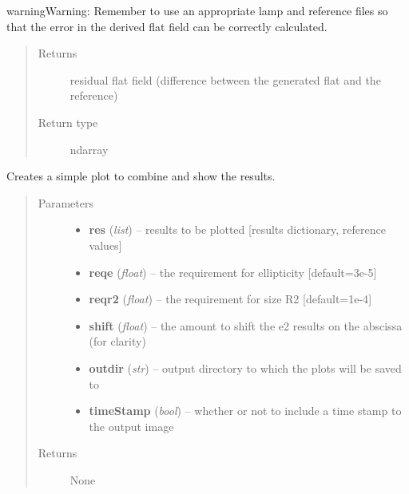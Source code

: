 \documentclass[a4paper,11pt,english]{sphinxmanual}
\begin{document}
\begin{fulllineitems}
\begin{notice}{warning}{Warning:}
Remember to use an appropriate lamp and reference files so that the error in the derived
flat field can be correctly calculated.
\end{notice}
\begin{quote}\begin{description}
\item[{Returns}] \leavevmode
residual flat field (difference between the generated flat and the reference)

\item[{Return type}] \leavevmode
ndarray

\end{description}\end{quote}

\end{fulllineitems}


\begin{fulllineitems}
\label{reduction:analysis.FlatfieldCalibration.plotNumberOfFrames}
Creates a simple plot to combine and show the results.
\begin{quote}\begin{description}
\item[{Parameters}] \leavevmode\begin{itemize}
\item {} 
\textbf{res} (\emph{list}) -- results to be plotted {[}results dictionary, reference values{]}

\item {} 
\textbf{reqe} (\emph{float}) -- the requirement for ellipticity {[}default=3e-5{]}

\item {} 
\textbf{reqr2} (\emph{float}) -- the requirement for size R2 {[}default=1e-4{]}

\item {} 
\textbf{shift} (\emph{float}) -- the amount to shift the e2 results on the abscissa (for clarity)

\item {} 
\textbf{outdir} (\emph{str}) -- output directory to which the plots will be saved to

\item {} 
\textbf{timeStamp} (\emph{bool}) -- whether or not to include a time stamp to the output image

\end{itemize}

\item[{Returns}] \leavevmode
None

\end{description}\end{quote}

\end{fulllineitems}
\end{document}
